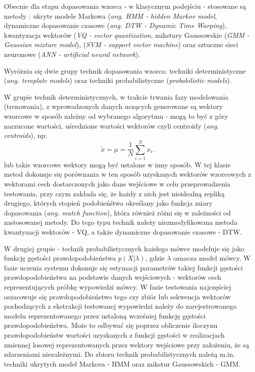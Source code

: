 Obecnie dla etapu dopasowania wzorca - w klasycznym podejściu - stosowane są metody\cite{campbell} \cite{overview}: ukryte modele Markowa (\textit{ang. HMM - hidden Markov model}, dynamiczne dopasowanie czasowe (\textit{ang. DTW - Dynamic Time Warping}), kwantyzacja wektorów (\textit{VQ - vector quantization}, mikstury Gaussowskie (\textit{GMM - Gaussian mixture model}), (\textit{SVM - support vector machine}) oraz sztuczne sieci neuronowe (\textit{ANN - artificial neural network}).

Wyróżnia się dwie grupy technik dopasowania wzorca: techniki deterministyczne (\textit{ang. template models}) oraz techniki probabilistyczne (\textit{probabilistic models})\cite{campbell}.

W grupie technik deterministycznych, w trakcie trwania fazy modelowania (trenowania), z wprowadzonych danych uczących generowane są wektory wzorcowe w sposób zależny od wybranego algorytmu - mogą to być z góry narzucone wartości, uśrednione wartości wektorów  czyli centroidy (\textit{ang. centroids}), np:
\begin{equation}
  \tilde{x} = \mu = \frac{1}{N}\sum_{i=1}^{N}x_i.
  \label{centroid}
\end{equation}
lub takie wzorcowe wektory mogą być ustalone w inny sposób. W tej klasie metod dokonuje się porównania w ten sposób uzyskanych wektorów wzorcowych z wektorami cech dostarczonych jako dane wejściowe w celu przeprowadzenia testowania, przy czym zakłada się, że \cite{overview} \cite{campbell} każdy z nich jest nieidealną repliką drugiego, których stopień podobieńśtwa określany jako funkcja miary dopasowania (\textit{ang. match function}), która również różni się w zależności od zastosowanej metody. Do tego typu technik należy niezmodyfikowana metoda kwantyzacji wektorów - VQ, a także dynamiczne dopasowanie czasowe - DTW.

W drugiej grupie - technik probabilistycznych każdego mówce modeluje się jako funkcję gęstości prawdopodobieństwa $ p(X|\lambda)$, gdzie $\lambda$ oznacza model mówcy. W fazie uczenia systemu dokonuje się estymacji parametrów takiej funkcji gęstości prawdopodobieństwa na podstawie danych wejściowych - wektorów cech reprezentujących próbkę wypowiedzi mówcy. W fazie testowania najczęściej oszacowuje się prawdopodobieństwo tego czy zbiór lub sekwencja wektorów pochodzących z ekstrakcji testowanej wypowiedzi należy do zarejestrowanego modelu reprezentowanego przez ustaloną wcześniej funkcję gęstości prawdopodobieństwa. Może to odbywać się poprzez obliczenie iloczynu prawdopodobieństw wartości uzyskanych z funkcji gęstości w realizacjach zmiennej losowej reprezentowanych przez wektory wejściowe przy założeniu, że są zdarzeniami niezależnymi. 
Do zbioru technik probabilistycznych należą m.in. techniki ukrytych model Markova - HMM oraz mikstur Gaussowskich - GMM.

